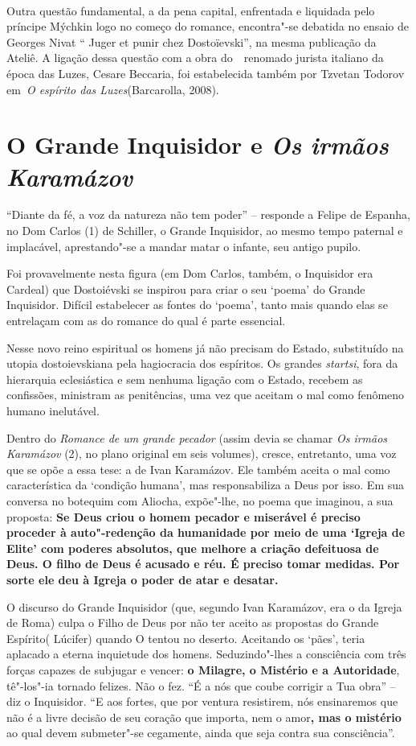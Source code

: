 ~

Outra questão fundamental, a da pena capital, enfrentada e liquidada
pelo príncipe Mýchkin logo no começo do romance, encontra"-se debatida no
ensaio de Georges Nivat `` Juger et punir chez Dostoïevski'', na mesma
publicação da Ateliê. A ligação dessa questão com a obra do~~renomado
jurista italiano da época das Luzes, Cesare Beccaria, foi estabelecida
também por Tzvetan Todorov em~\emph{O espírito das Luzes}(Barcarolla,
2008).

\chapter{O Grande Inquisidor e \emph{Os irmãos Karamázov}}

``Diante da fé, a voz da natureza não tem poder'' -- responde a Felipe
de Espanha, no Dom Carlos (1) de Schiller, o Grande Inquisidor, ao mesmo
tempo paternal e implacável, aprestando"-se a mandar matar o infante, seu
antigo pupilo.

Foi provavelmente nesta figura (em Dom Carlos, também, o Inquisidor era
Cardeal) que Dostoiévski se inspirou para criar o seu `poema' do Grande
Inquisidor. Difícil estabelecer as fontes do `poema', tanto mais quando
elas se entrelaçam com as do romance do qual é parte essencial.

Nesse novo reino espiritual os homens já não precisam do Estado,
substituído na utopia dostoievskiana pela hagiocracia dos espíritos. Os
grandes \emph{startsi}, fora da hierarquia eclesiástica e sem nenhuma
ligação com o Estado, recebem as confissões, ministram as penitências,
uma vez que aceitam o mal como fenômeno humano inelutável.

Dentro do \emph{Romance de um grande pecador} (assim devia se chamar
\emph{Os irmãos Karamázov} (2), no plano original em seis volumes),
cresce, entretanto, uma voz que se opõe a essa tese: a de Ivan
Karamázov. Ele também aceita o mal como característica da `condição
humana', mas responsabiliza a Deus por isso. Em sua conversa no botequim
com Aliocha, expõe"-lhe, no poema que imaginou, a sua proposta:
\textbf{Se Deus criou o homem pecador e miserável é preciso proceder à
auto"-redenção da humanidade por meio de uma `Igreja de Elite' com
poderes absolutos, que melhore a criação defeituosa de Deus. O filho de
Deus é acusado e réu. É preciso tomar medidas. Por sorte ele deu à
Igreja o poder de atar e desatar.}

O discurso do Grande Inquisidor (que, segundo Ivan Karamázov, era o da
Igreja de Roma) culpa o Filho de Deus por não ter aceito as propostas do
Grande Espírito( Lúcifer) quando O tentou no deserto. Aceitando os
`pães', teria aplacado a eterna inquietude dos homens. Seduzindo"-lhes a
consciência com três forças capazes de subjugar e vencer: \textbf{o
Milagre, o Mistério e a Autoridade}, tê"-los"-ia tornado felizes. Não o
fez. ``É a nós que coube corrigir a Tua obra'' -- diz o Inquisidor. ``E
aos fortes, que por ventura resistirem, nós ensinaremos que não é a
livre decisão de seu coração que importa, nem o amor\textbf{, mas o
mistério} ao qual devem submeter"-se cegamente, ainda que seja contra sua
consciência''.

